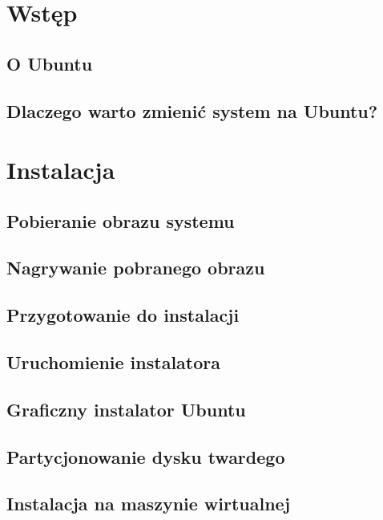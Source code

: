 \documentclass[a4paper,11pt,oneside]{mwart}
\begin{document}


\section{Wstęp}
        
        \subsection{O Ubuntu}
                
        \subsection{Dlaczego warto zmienić system na Ubuntu?}
                
\section{Instalacja}
        \subsection{Pobieranie obrazu systemu}
                
        \subsection{Nagrywanie pobranego obrazu}
                
                
        \subsection{Przygotowanie do instalacji}
                
        \subsection{Uruchomienie instalatora}
                
        \subsection{Graficzny instalator Ubuntu}
                
        \subsection{Partycjonowanie dysku twardego}
                
        \subsection{Instalacja na maszynie wirtualnej}
                  
\end{document}
